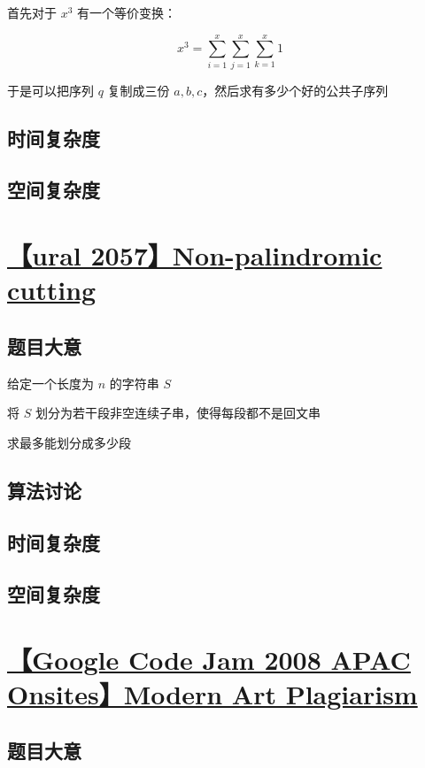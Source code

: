 \documentclass[UTF8]{article}
\begin{document}
首先对于 $x^3$ 有一个等价变换：

$$
x^3=\sum_{i=1}^{x}\sum_{j=1}^{x}\sum_{k=1}^{x}1
$$

于是可以把序列 $q$ 复制成三份 $a,b,c$，然后求有多少个好的公共子序列

\subsection{时间复杂度}

\subsection{空间复杂度}

\section{\href{https://vjudge.net/problem/URAL-2057}{【ural 2057】Non-palindromic cutting}}

\subsection{题目大意}

给定一个长度为 $n$ 的字符串 $S$

将 $S$ 划分为若干段非空连续子串，使得每段都不是回文串

求最多能划分成多少段

\subsection{算法讨论}

\subsection{时间复杂度}

\subsection{空间复杂度}

\section{\href{https://www.lydsy.com/JudgeOnline/problem.php?id=2368}{【Google Code Jam 2008 APAC Onsites】Modern Art Plagiarism}}

\subsection{题目大意}
\end{document}
